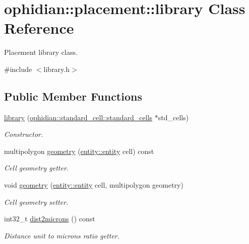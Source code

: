 \hypertarget{classophidian_1_1placement_1_1library}{\section{ophidian\-:\-:placement\-:\-:library Class Reference}
\label{classophidian_1_1placement_1_1library}
}


Placement library class.  




{\ttfamily \#include $<$library.\-h$>$}

\subsection*{Public Member Functions}
\begin{DoxyCompactItemize}
\item 
\hyperlink{classophidian_1_1placement_1_1library_a33f89c4a0aa6a5f27a0f7b6b1021bac5}{library} (\hyperlink{classophidian_1_1standard__cell_1_1standard__cells}{ophidian\-::standard\-\_\-cell\-::standard\-\_\-cells} $\ast$std\-\_\-cells)
\begin{DoxyCompactList}\small\item\em Constructor. \end{DoxyCompactList}\item 
multipolygon \hyperlink{classophidian_1_1placement_1_1library_afc2a71a35aa645d13c4e55884a46b219}{geometry} (\hyperlink{classophidian_1_1entity_1_1entity}{entity\-::entity} cell) const 
\begin{DoxyCompactList}\small\item\em Cell geometry getter. \end{DoxyCompactList}\item 
void \hyperlink{classophidian_1_1placement_1_1library_af050cbfc19f4e4294b8a21a01f0c8b9d}{geometry} (\hyperlink{classophidian_1_1entity_1_1entity}{entity\-::entity} cell, multipolygon geometry)
\begin{DoxyCompactList}\small\item\em Cell geometry setter. \end{DoxyCompactList}\item 
int32\-\_\-t \hyperlink{classophidian_1_1placement_1_1library_a418ab862570f88891352d4025b4d90b5}{dist2microns} () const 
\begin{DoxyCompactList}\small\item\em Distance unit to microns ratio getter. \end{DoxyCompactList}\item 

\end{DoxyCompactItemize}
